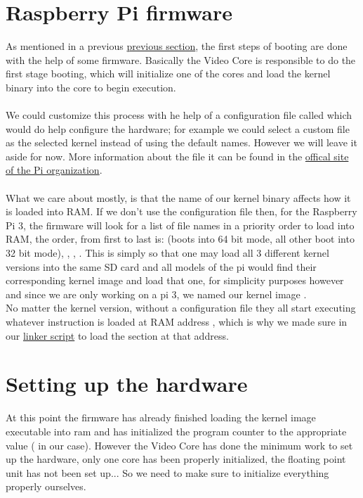 \documentclass[12pt, svgnames]{book}
\begin{document}
\section{Raspberry Pi firmware}

As mentioned in a previous  \hyperref[sec:Software]{previous section}, the first steps of booting are done with the help of some firmware. Basically the Video Core is responsible to do the first stage booting, which will initialize one of the cores and load the kernel binary into the core to begin execution.
\\~\\
We could customize this process with he help of a configuration file called  which would do help configure the hardware; for example we could select a custom file as the selected kernel instead of using the default names. However we will leave it aside for now. More information about the  file it can be found in the \href{https://www.raspberrypi.org/documentation/configuration/config-txt/}{offical site of the Pi organization}.
\\~\\
What we care about mostly, is that the name of our kernel binary affects how it is loaded into RAM. If we don't use the configuration file then, for the Raspberry Pi 3, the firmware will look for a list of file names in a priority order to load into RAM, the order, from first to last is:
 (boots into 64 bit mode, all other boot into 32 bit mode), , , . This is simply so that one may load all 3 different kernel versions into the same SD card and all models of the pi would find their corresponding kernel image and load that one, for simplicity purposes however and since we are only working on a pi 3, we named our kernel image .
\\
No matter the kernel version, without a configuration file they all start executing whatever instruction is loaded at RAM address , which is why we made sure in our \hyperlink{linker script}{linker script} to load the  section at that address.

\section{Setting up the hardware}
\label{sec:Setting up the hardware}

At this point the firmware has already finished loading the kernel image executable into ram and has initialized the program counter to the appropriate value ( in our case). However the Video Core has done the minimum work to set up the hardware, only one core has been properly initialized, the floating point unit has not been set up... So we need to make sure to initialize everything properly ourselves.
\end{document}
